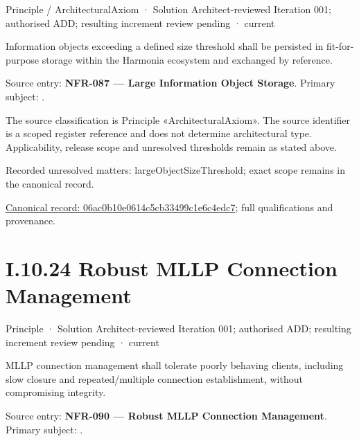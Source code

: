\label{element:06ac0b10e0614c5cb33499c1e6c4edc7}
{\small Principle / ArchitecturalAxiom · Solution Architect-reviewed Iteration 001; authorised ADD; resulting increment review pending · current}\par

Information objects exceeding a defined size threshold shall be persisted in fit-for-purpose storage within the Harmonia ecosystem and exchanged by reference.



Source entry: \textbf{NFR-087 — Large Information Object Storage}. Primary subject: \texttt{}.



The source classification is Principle «ArchitecturalAxiom». The source identifier is a scoped register reference and does not determine architectural type. Applicability, release scope and unresolved thresholds remain as stated above.


{\small Recorded unresolved matters: largeObjectSizeThreshold; exact scope remains in the canonical record.}\par
{\footnotesize \href{../../../../continuum/motivation/principle/architectural-axiom/06ac0b10e0614c5cb33499c1e6c4edc7.md}{Canonical record: 06ac0b10e0614c5cb33499c1e6c4edc7}; full qualifications and provenance.}\par
\section*{I.10.24 Robust MLLP Connection Management}
\label{navigation:I.10.24}

\label{element:e7b7d94a94194ef28a12051a550d3f3f}
{\small Principle · Solution Architect-reviewed Iteration 001; authorised ADD; resulting increment review pending · current}\par

MLLP connection management shall tolerate poorly behaving clients, including slow closure and repeated/multiple connection establishment, without compromising integrity.



Source entry: \textbf{NFR-090 — Robust MLLP Connection Management}. Primary subject: \texttt{}.



